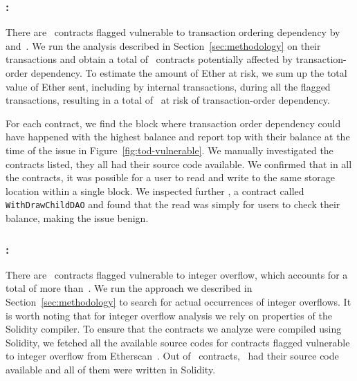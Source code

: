 



\subsubsection{\vto: \transactionorder}
There are~ contracts flagged vulnerable to transaction ordering dependency by~\cite{Luu2016a} and~\cite{DBLP:conf/ndss/KalraGDS18}. We run the analysis described in Section~\ref{sec:methodology} on their  transactions and obtain a total of~ contracts potentially affected by transaction-order dependency. To estimate the amount of Ether at risk, we sum up the total value of Ether sent, including by internal transactions, during all the flagged transactions, resulting in a total of~ at risk of transaction-order dependency.

For each contract, we find the block where transaction order dependency could have happened with the highest balance and report top with their balance at the time of the issue in Figure~\ref{fig:tod-vulnerable}. We manually investigated the contracts listed, they all had their source code available. We confirmed that in all the contracts, it was possible for a user to read and write to the same storage location within a single block. We inspected further , a contract called \lstinline{WithDrawChildDAO} and found that the read was simply for users to check their balance, making the issue benign.

% 



\subsubsection{\vio: \integeroverflow}
\label{ssec:analysis-io}
There are~ contracts flagged vulnerable to integer overflow, which accounts for a total of more than~. We run the approach we described in Section~\ref{sec:methodology} to search for actual occurrences of integer overflows.
It is worth noting that for integer overflow analysis we rely on properties of the Solidity compiler. To ensure that the contracts we analyze were compiled using Solidity, we fetched all the available source codes for contracts flagged vulnerable to integer overflow from Etherscan~\cite{etherscan}. Out of~ contracts,~ had their source code available and all of them were written in Solidity.

